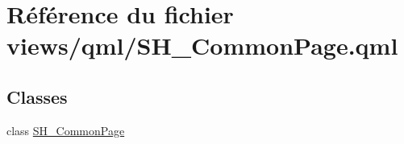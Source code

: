 \hypertarget{SH__CommonPage_8qml}{\section{Référence du fichier views/qml/\-S\-H\-\_\-\-Common\-Page.qml}
\label{SH__CommonPage_8qml}
}
\subsection*{Classes}
\begin{DoxyCompactItemize}
\item 
class \hyperlink{classSH__CommonPage}{S\-H\-\_\-\-Common\-Page}
\end{DoxyCompactItemize}

